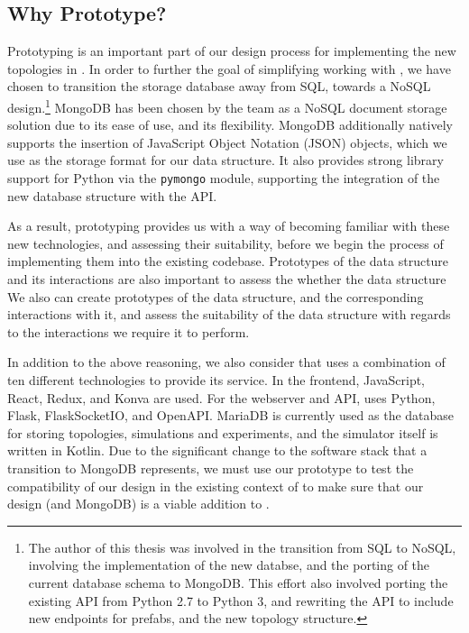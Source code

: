 \documentclass[11pt]{article}
\begin{document}
	\subsection{Why Prototype?}
		Prototyping is an important part of our design process for implementing the new topologies in \opendc{}.
		In order to further the goal of simplifying working with \opendc{}, we have chosen to transition the storage database away from SQL, towards a NoSQL design.\footnote{The author of this thesis was involved in the transition from SQL to NoSQL, involving the implementation of the new databse, and the porting of the current database schema to MongoDB. 
		This effort also involved porting the existing \opendc{} API from Python 2.7 to Python 3, and rewriting the API to include new endpoints for prefabs, and the new topology structure.}
		MongoDB has been chosen by the \opendc{} team as a NoSQL document storage solution due to its ease of use, and its flexibility.
		MongoDB additionally natively supports the insertion of JavaScript Object Notation (JSON) objects, which we use as the storage format for our data structure.
		It also provides strong library support for Python via the \verb|pymongo| module, supporting the integration of the new database structure with the \opendc{} API.

		As a result, prototyping provides us with a way of becoming familiar with these new technologies, and assessing their suitability, before we begin the process of implementing them into the existing \opendc{} codebase.
		Prototypes of the data structure and its interactions are also important to assess the whether the data structure 
		We also can create prototypes of the data structure, and the corresponding interactions with it, and assess the suitability of the data structure with regards to the interactions we require it to perform.

		In addition to the above reasoning, we also consider that \opendc{} uses a combination of ten different technologies to provide its service.
		In the frontend, JavaScript, React, Redux, and Konva are used. For the webserver and API, \opendc{} uses Python, Flask, FlaskSocketIO, and OpenAPI.
		MariaDB is currently used as the database for storing topologies, simulations and experiments, and the simulator itself is written in Kotlin.
		Due to the significant change to the software stack that a transition to MongoDB represents, we must use our prototype to test the compatibility of our design in the existing context of \opendc{} to make sure that our design (and MongoDB) is a viable addition to \opendc{}.
\end{document}
